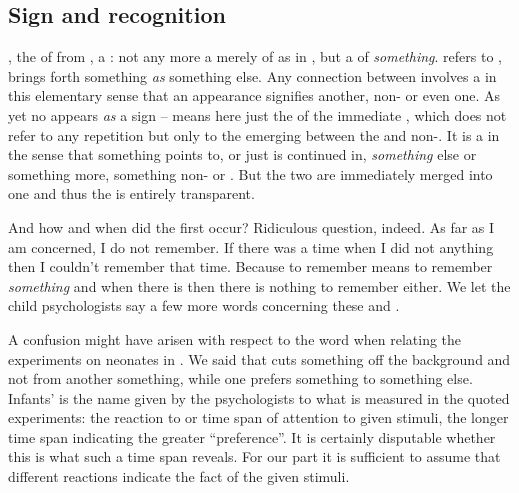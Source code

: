 \subsection{Sign and recognition}
\pa\label{pa:signB} , the  of  from
,  a : not any more a merely 
 of  as in , but a 
of {\em something}.   refers  to
, brings forth something  {\em as} something
else.  Any connection between  involves a  in this
elementary sense that an  appearance signifies another,
non- or even  one.  As
yet no  appears {\em as} a sign --  means here just the
 of the immediate , which  does not refer to
any repetition but only to the emerging  between the 
and non-. It is a  in the sense that something 
points to, or just is continued in, {\em something} else or something more,
something non- or . But the two are immediately merged
into one and thus the  is entirely transparent.

And how and when did the first  occur? Ridiculous question,
indeed. As far as I am concerned, I do not remember. If there was a time when I
did not  anything then I couldn't remember that time. Because to
remember means to remember {\em something} and when there is  then
there is nothing to remember either. We let the child psychologists say a few
more words concerning these  and .

\pa A confusion might have arisen with respect to the word  when
relating the experiments on neonates in . We said that
 {cuts} something off the background and not from
another something, while one prefers something to something else. Infants'
 is the name given by the psychologists to what is measured in
the quoted experiments: the reaction to or time span of attention to given
stimuli, the longer time span indicating the greater ``preference''. It is
certainly disputable whether this is what such a time span reveals. For our part
it is sufficient to assume that different reactions indicate the fact of
 the given stimuli.

